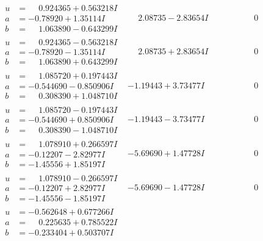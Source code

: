 \documentclass[1p]{elsarticle_modified}
\theoremstyle{definition}
\begin{document}
$$\begin{array}{c|c|c}
\begin{aligned}
u &= \phantom{-}0.924365 + 0.563218 I \\
a &= -0.78920 + 1.35114 I \\
b &= \phantom{-}1.063890 - 0.643299 I\end{aligned}
 & \phantom{-}2.08735 - 2.83654 I & \phantom{-0.000000 } 0 \\ \hline\begin{aligned}
u &= \phantom{-}0.924365 - 0.563218 I \\
a &= -0.78920 - 1.35114 I \\
b &= \phantom{-}1.063890 + 0.643299 I\end{aligned}
 & \phantom{-}2.08735 + 2.83654 I & \phantom{-0.000000 } 0 \\ \hline\begin{aligned}
u &= \phantom{-}1.085720 + 0.197443 I \\
a &= -0.544690 - 0.850906 I \\
b &= \phantom{-}0.308390 + 1.048710 I\end{aligned}
 & -1.19443 + 3.73477 I & \phantom{-0.000000 } 0 \\ \hline\begin{aligned}
u &= \phantom{-}1.085720 - 0.197443 I \\
a &= -0.544690 + 0.850906 I \\
b &= \phantom{-}0.308390 - 1.048710 I\end{aligned}
 & -1.19443 - 3.73477 I & \phantom{-0.000000 } 0 \\ \hline\begin{aligned}
u &= \phantom{-}1.078910 + 0.266597 I \\
a &= -0.12207 - 2.82977 I \\
b &= -1.45556 + 1.85197 I\end{aligned}
 & -5.69690 + 1.47728 I & \phantom{-0.000000 } 0 \\ \hline\begin{aligned}
u &= \phantom{-}1.078910 - 0.266597 I \\
a &= -0.12207 + 2.82977 I \\
b &= -1.45556 - 1.85197 I\end{aligned}
 & -5.69690 - 1.47728 I & \phantom{-0.000000 } 0 \\ \hline\begin{aligned}
u &= -0.562648 + 0.677266 I \\
a &= \phantom{-}0.225635 + 0.785522 I \\
b &= -0.233404 + 0.503707 I\end{aligned}

\end{array}$$
\end{document}
